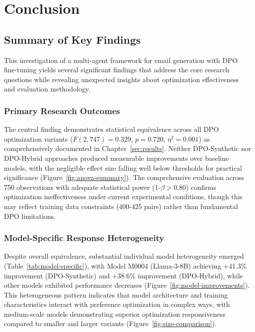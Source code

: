 \chapter{Conclusion}
\label{sec:conclusion}

\section{Summary of Key Findings}
\label{sec:key-findings}

This investigation of a multi-agent framework for email generation with DPO fine-tuning yields several significant findings that address the core research questions while revealing unexpected insights about optimization effectiveness and evaluation methodology.

\subsection{Primary Research Outcomes}

The central finding demonstrates statistical equivalence across all DPO optimization variants ($F(2,747) = 0.329$, $p = 0.720$, $\eta^2 = 0.001$) as comprehensively documented in Chapter~\ref{sec:results}. Neither DPO-Synthetic nor DPO-Hybrid approaches produced measurable improvements over baseline models, with the negligible effect size falling well below thresholds for practical significance (Figure~\ref{fig:anova-summary}). The comprehensive evaluation across 750 observations with adequate statistical power (1-$\beta > 0.80$) confirms optimization ineffectiveness under current experimental conditions, though this may reflect training data constraints (400-425 pairs) rather than fundamental DPO limitations.

\subsection{Model-Specific Response Heterogeneity}

Despite overall equivalence, substantial individual model heterogeneity emerged (Table~\ref{tab:model-specific}), with Model M0004 (Llama-3-8B) achieving +41.3\% improvement (DPO-Synthetic) and +38.6\% improvement (DPO-Hybrid), while other models exhibited performance decreases (Figure~\ref{fig:model-improvements}). This heterogeneous pattern indicates that model architecture and training characteristics interact with preference optimization in complex ways, with medium-scale models demonstrating superior optimization responsiveness compared to smaller and larger variants (Figure~\ref{fig:size-comparison}).

